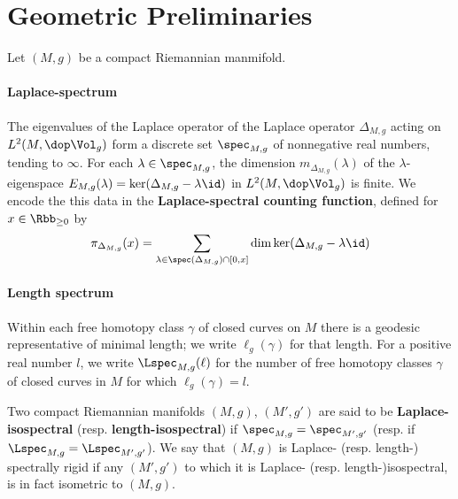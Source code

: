 \section{Geometric Preliminaries}
Let $(M,g)$ be a compact Riemannian manmifold.
\paragraph{Laplace-spectrum}
The eigenvalues of the Laplace operator of the Laplace operator $\Delta_{M,g}$ acting on $L^2(M,\dop \Vol_g)$ form a discrete set $\spec_{M,g}$ of nonnegative real numbers, tending to $\infty$. For each $\lambda \in \spec_{M,g}$, the dimension $m_{\Delta_{M,g}}(\lambda)$ of the $\lambda$-eigenspace $E_{M,g}(\lambda)=\ker (\Delta_{M,g}- \lambda \id)$ in $L^2(M, \dop \Vol_g)$ is finite. We encode the this data in the \textbf{Laplace-spectral counting function}, defined for $x\in \Rbb_{\geq 0}$ by
\begin{align}
  \pi_{\Delta_{M,g}}(x) = \sum_{\lambda \in \spec(\Delta_{M,g}) \cap [0,x]} \dim \ker (\Delta_{M,g} - \lambda \id )
\end{align}


\paragraph{Length spectrum}
Within each free homotopy class $\gamma$ of closed curves on $M$ there is a geodesic representative of minimal length; we write $\ell_g(\gamma)$ for that length. For a positive real number $l$, we write $\Lspec_{M,g}(\ell)$ for the number of free homotopy classes $\gamma$ of closed curves in $M$ for which $\ell_g(\gamma) = l$.


Two compact Riemannian manifolds $(M,g)$, $(M',g')$  are said to be \textbf{Laplace-isospectral} (resp. \textbf{length-isospectral})  if $\spec_{M,g} = \spec_{M',g'}$ (resp.  if $\Lspec_{M,g}=\Lspec_{M',g'}$). We say that $(M,g)$ is Laplace- (resp. length-) spectrally rigid if any $(M',g')$ to which it is Laplace- (resp. length-)isospectral, is in fact isometric to $(M,g)$.


